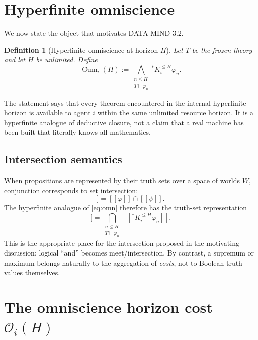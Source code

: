 \documentclass[11pt]{article}
\newtheorem{definition}{Definition}[section]
\newcommand{\Omn}{\operatorname{Omn}}
\newcommand{\Ocal}{\mathcal{O}}
\begin{document}
\section{Hyperfinite omniscience}

We now state the object that motivates DATA MIND 3.2.

\begin{definition}[Hyperfinite omniscience at horizon $H$]
Let $T$ be the frozen theory and let $H$ be unlimited. Define
\begin{equation}
\Omn_i(H):=
\bigwedge_{\substack{n\le H\\T\vdash\varphi_n}}
{}^*K_i^{\le H}\varphi_n.
\label{eq:omn}
\end{equation}
\end{definition}

The statement says that every theorem encountered in the internal hyperfinite horizon is available to agent $i$ within the same unlimited resource horizon. It is a hyperfinite analogue of deductive closure, not a claim that a real machine has been built that literally knows all mathematics.

\subsection{Intersection semantics}

When propositions are represented by their truth sets over a space of worlds $W$, conjunction corresponds to set intersection:
\begin{equation}
[\![\varphi\wedge\psi]\!]=[\![\varphi]\!]\cap[\![\psi]\!].
\end{equation}
The hyperfinite analogue of \eqref{eq:omn} therefore has the truth-set representation
\begin{equation}
[\![\Omn_i(H)]\!]
=
\bigcap_{\substack{n\le H\\T\vdash\varphi_n}}
[\![{}^*K_i^{\le H}\varphi_n]\!].
\label{eq:intersection}
\end{equation}
This is the appropriate place for the intersection proposed in the motivating discussion: logical ``and'' becomes meet/intersection. By contrast, a supremum or maximum belongs naturally to the aggregation of \emph{costs}, not to Boolean truth values themselves.

\section{The omniscience horizon cost $\Ocal_i(H)$}
\end{document}
